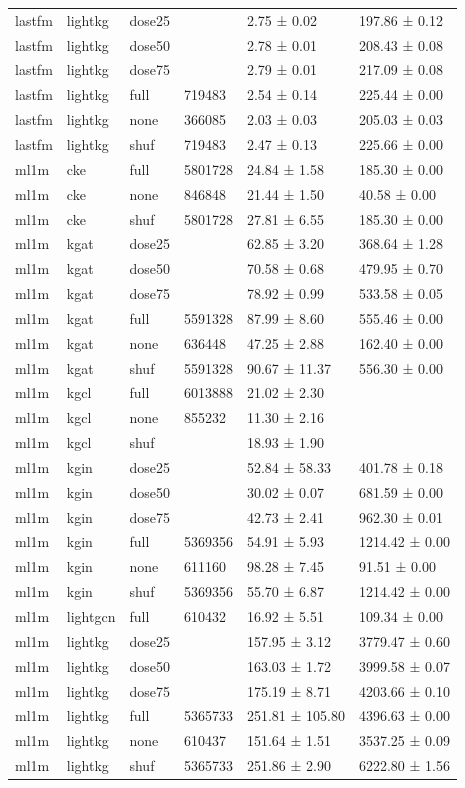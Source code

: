 \begin{table}[t]
\begin{tabular}{llllll}
lastfm & lightkg & dose25 &  & 2.75 ± 0.02 & 197.86 ± 0.12 \\
lastfm & lightkg & dose50 &  & 2.78 ± 0.01 & 208.43 ± 0.08 \\
lastfm & lightkg & dose75 &  & 2.79 ± 0.01 & 217.09 ± 0.08 \\
lastfm & lightkg & full & 719483 & 2.54 ± 0.14 & 225.44 ± 0.00 \\
lastfm & lightkg & none & 366085 & 2.03 ± 0.03 & 205.03 ± 0.03 \\
lastfm & lightkg & shuf & 719483 & 2.47 ± 0.13 & 225.66 ± 0.00 \\
ml1m & cke & full & 5801728 & 24.84 ± 1.58 & 185.30 ± 0.00 \\
ml1m & cke & none & 846848 & 21.44 ± 1.50 & 40.58 ± 0.00 \\
ml1m & cke & shuf & 5801728 & 27.81 ± 6.55 & 185.30 ± 0.00 \\
ml1m & kgat & dose25 &  & 62.85 ± 3.20 & 368.64 ± 1.28 \\
ml1m & kgat & dose50 &  & 70.58 ± 0.68 & 479.95 ± 0.70 \\
ml1m & kgat & dose75 &  & 78.92 ± 0.99 & 533.58 ± 0.05 \\
ml1m & kgat & full & 5591328 & 87.99 ± 8.60 & 555.46 ± 0.00 \\
ml1m & kgat & none & 636448 & 47.25 ± 2.88 & 162.40 ± 0.00 \\
ml1m & kgat & shuf & 5591328 & 90.67 ± 11.37 & 556.30 ± 0.00 \\
ml1m & kgcl & full & 6013888 & 21.02 ± 2.30 &  \\
ml1m & kgcl & none & 855232 & 11.30 ± 2.16 &  \\
ml1m & kgcl & shuf &  & 18.93 ± 1.90 &  \\
ml1m & kgin & dose25 &  & 52.84 ± 58.33 & 401.78 ± 0.18 \\
ml1m & kgin & dose50 &  & 30.02 ± 0.07 & 681.59 ± 0.00 \\
ml1m & kgin & dose75 &  & 42.73 ± 2.41 & 962.30 ± 0.01 \\
ml1m & kgin & full & 5369356 & 54.91 ± 5.93 & 1214.42 ± 0.00 \\
ml1m & kgin & none & 611160 & 98.28 ± 7.45 & 91.51 ± 0.00 \\
ml1m & kgin & shuf & 5369356 & 55.70 ± 6.87 & 1214.42 ± 0.00 \\
ml1m & lightgcn & full & 610432 & 16.92 ± 5.51 & 109.34 ± 0.00 \\
ml1m & lightkg & dose25 &  & 157.95 ± 3.12 & 3779.47 ± 0.60 \\
ml1m & lightkg & dose50 &  & 163.03 ± 1.72 & 3999.58 ± 0.07 \\
ml1m & lightkg & dose75 &  & 175.19 ± 8.71 & 4203.66 ± 0.10 \\
ml1m & lightkg & full & 5365733 & 251.81 ± 105.80 & 4396.63 ± 0.00 \\
ml1m & lightkg & none & 610437 & 151.64 ± 1.51 & 3537.25 ± 0.09 \\
ml1m & lightkg & shuf & 5365733 & 251.86 ± 2.90 & 6222.80 ± 1.56 \\
\hline
\end{tabular}
\end{table}
